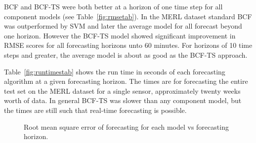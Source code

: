 BCF and BCF-TS were both better at a horizon of one time step for all component models (see Table~\ref{fig:rmsetab}).  In the MERL dataset standard BCF was outperformed by SVM and later the average model for all forecast beyond one horizon.  However the BCF-TS model showed significant improvement in RMSE scores for all forecasting horizons unto 60 minutes.  For horizons of 10 time steps and greater, the average model is about as good as the BCF-TS approach.

Table~\ref{fig:runtimestab} shows the run time in seconds of each forecasting algorithm at a given forecasting horizon.  The times are for forecasting the entire test set on the MERL dataset for a single sensor, approximately twenty weeks worth of data.  In general BCF-TS was slower than any component model, but the times are still such that real-time forecasting is possible.

\begin{figure}[!ht]
	\begin{center}
	\end{center}
	\caption{Root mean square error of forecasting for each model vs forecasting horizon.}
	\label{fig:rmseplot}
\end{figure}


